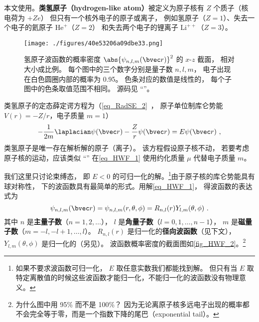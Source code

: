 

本文使用。\textbf{类氢原子（hydrogen-like atom）}被定义为原子核有 $Z$ 个质子（核电荷为 $+Ze$） 但只有一个核外电子的原子或离子， 例如氢原子（$Z=1$）、失去一个电子的氦原子 $\mathrm{He}^+$（$Z=2$） 和失去两个电子的锂离子 $\mathrm{Li}^{++}$（$Z=3$）。 

\begin{figure}[ht]
\centering
\texttt{[image: ./figures/40e53206a09dbe33.png]}
\caption{氢原子波函数的概率密度 $\abs{\psi_{n,l,m}(\bvec r)}^2$ 的 $x$-$z$ 截面， 相对大小成比例。 每个图中的三个数字分别是量子数 $n, l, m$， 电子出现在白色圆圈内部的概率为 0.95。 色条对应的数值是线性的， 每个子图中的色条取值范围不相同。 源码见 “”。} \label{fig_HWF_2}
\end{figure}

类氢原子的定态薛定谔方程为（\autoref{eq_RadSE_2}~， 原子单位制库仑势能 $V(r)=-Z/r$，电子质量 $m=1$）
\begin{equation}\label{eq_HWF_1}
-\frac{1}{2m} \laplacian \psi(\bvec r) - \frac{Z}{r} \psi(\bvec r) = E \psi(\bvec r)~,
\end{equation}
类氢原子是唯一存在解析解的原子（离子）。 该方程假设原子核不动， 若要考虑原子核的运动，应该类似 “” 在\autoref{eq_HWF_1} 使用约化质量 $\mu$ 代替电子质量 $m$。

我们这里只讨论束缚态， 即 $E < 0$ 的可归一化的解。\footnote{如果不要求波函数可归一化， $E$ 取任意实数我们都能找到解。 但只有当 $E$ 取特定离散值的时候这些波函数才能归一化，不能归一化的波函数没有物理意义。}由于原子核的库仑势能具有球对称性， 下的波函数具有最简单的形式。用解\autoref{eq_HWF_1}， 得波函数的表达式为
\begin{equation}\label{eq_HWF_3}
\psi_{n,l,m}(\bvec r) = \psi_{n,l,m}(r,\theta ,\phi) = R_{n,l}(r) Y_{l,m}(\theta, \phi)~.
\end{equation}
其中 $n$ 是\textbf{主量子数}（$n = 1, 2, \dots$）， $l$ 是\textbf{角量子数}（$l = 0, 1, \dots, n - 1$）， $m$ 是\textbf{磁量子数}（$m = -l, -l+1, \dots, l$）。 $R_{n,l}(r)$ 是归一化的\textbf{径向波函数}（见下文）， $Y_{l,m}(\theta, \phi)$ 是归一化的（另见）。 波函数概率密度的截面图如\autoref{fig_HWF_2}。\footnote{为什么图中用 95\% 而不是 100\%？ 因为无论离原子核多远电子出现的概率都不会完全等于零，而是一个指数下降的尾巴（exponential tail）。}

